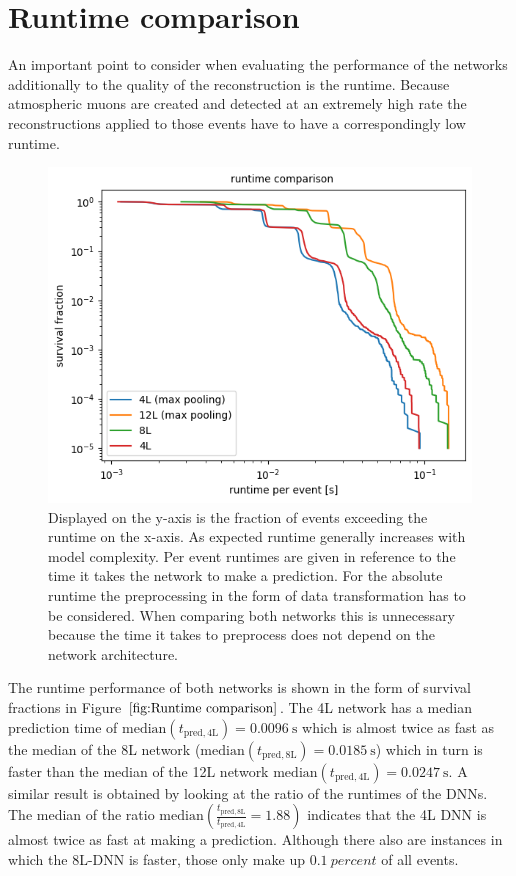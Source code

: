 \documentclass[
  tucolor,       %
  BCOR=12mm,     %
  parskip=half,  %
  open=any,      %
  cleardoublepage=plain,  %
]{tudothesis}
\begin{document}
\chapter{Runtime comparison}
An important point to consider when evaluating the performance of the networks additionally to the quality of the reconstruction is the runtime.
Because atmospheric muons are created and detected at an extremely high rate the reconstructions applied to those events have to have a correspondingly low runtime.
\begin{figure}[h]
  \centering
  \includegraphics[scale=0.6]{Plots/Runtime comparison}
  \caption{Displayed on the y-axis is the fraction of events exceeding the runtime on the x-axis. As expected runtime generally increases with model complexity. Per event runtimes are given in reference to the time it takes the network to make a prediction. For the absolute runtime the preprocessing in the form of data transformation has to be considered. When comparing both networks this is unnecessary because the time it takes to preprocess does not depend on the network architecture.}
  \label{fig:Runtime comparison}
\end{figure}
The runtime performance of both networks is shown in the form of survival fractions in Figure $\ref{fig:Runtime comparison}$.
The 4L network has a median prediction time of $\mathrm{median}(t_{\mathrm{pred,4L}})=\SI{0.0096}{\second}$ which is almost twice as fast as the median of the 8L network ($\mathrm{median}(t_{\mathrm{pred,8L}})=\SI{0.0185}{\second}$) which in turn is faster than the median of the 12L network $\mathrm{median}(t_{\mathrm{pred,4L}})=\SI{0.0247}{\second}$.
A similar result is obtained by looking at the ratio of the runtimes of the DNNs. The median of the ratio $\mathrm{median}\left(\frac{t_{\mathrm{pred,8L}}}{t_{\mathrm{pred,4L}}}=\num{1.88}\right)$ indicates that the 4L DNN is almost twice as fast at making a prediction.
Although there also are instances in which the 8L-DNN is faster, those only make up $\SI{0.1}{percent}$ of all events.
\end{document}
